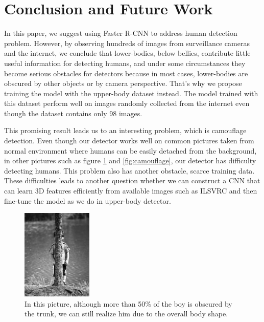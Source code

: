 \documentclass[conference]{IEEEtran}
\begin{document}
\section{Conclusion and Future Work}

In this paper, we suggest using Faster R-CNN to address human detection problem. However, by observing hundreds of images from surveillance cameras and the internet, we conclude that lower-bodies, below bellies, contribute little useful information for detecting humans, and under some circumstances they become serious obstacles for detectors because in most cases, lower-bodies are obscured by other objects or by camera perspective. That's why we propose training the model with the upper-body dataset instead. The model trained with this dataset perform well on images randomly collected from the internet even though the dataset contains only 98 images. 

This promising result leads us to an interesting problem, which is camouflage detection. Even though our detector works well on common pictures taken from normal environment where humans can be easily detached from the background, in other pictures such as figure \ref{fig:trunkboy} and \ref{fig:camouflage}, our detector has difficulty detecting humans. This problem also has another obstacle, scarce training data. These difficulties leads to another question whether we can construct a CNN that can learn 3D features efficiently from available images such as ILSVRC and then fine-tune the model as we do in upper-body detector.

\begin{figure}[h]
	\centering
	\includegraphics[width=0.3\textwidth]{019}
	\caption{In this picture, although more than 50\% of the boy is obscured by the trunk, we can still realize him due to the overall body shape.}\label{fig:trunkboy}
\end{figure}
\end{document}

